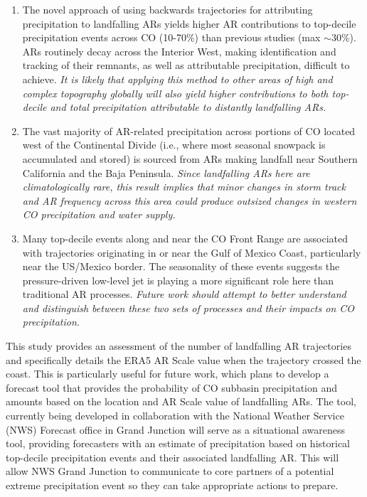 \documentclass[draft]{agujournal2019}
\begin{document}
\begin{enumerate}
  \item The novel approach of using backwards trajectories for attributing precipitation to landfalling ARs yields higher AR contributions to top-decile precipitation events across CO (10-70\%) than previous studies (max $\sim$30\%). ARs routinely decay across the Interior West, making identification and tracking of their remnants, as well as attributable precipitation, difficult to achieve. \textit{It is likely that applying this method to other areas of high and complex topography globally will also yield higher contributions to both top-decile and total precipitation attributable to distantly landfalling ARs.}
  \item The vast majority of AR-related precipitation across portions of CO located west of the Continental Divide (i.e., where most seasonal snowpack is accumulated and stored) is sourced from ARs making landfall near Southern California and the Baja Peninsula. \textit{Since landfalling ARs here are climatologically rare, this result implies that minor changes in storm track and AR frequency across this area could produce outsized changes in western CO precipitation and water supply.}
  \item Many top-decile events along and near the CO Front Range are associated with trajectories originating in or near the Gulf of Mexico Coast, particularly near the US/Mexico border. The seasonality of these events suggests the pressure-driven low-level jet is playing a more significant role here than traditional AR processes. \textit{Future work should attempt to better understand and distinguish between these two sets of processes and their impacts on CO precipitation.}
\end{enumerate}

This study provides an assessment of the number of landfalling AR trajectories and specifically details the ERA5 AR Scale \cite{MartinRalph2019} value when the trajectory crossed the coast. This is particularly useful for future work, which plans to develop a forecast tool that provides the probability of CO subbasin precipitation and amounts based on the location and AR Scale value of landfalling ARs. The tool, currently being developed in collaboration with the National Weather Service (NWS) Forecast office in Grand Junction will serve as a situational awareness tool, providing forecasters with an estimate of precipitation based on historical top-decile precipitation events and their associated landfalling AR. This will allow NWS Grand Junction to communicate to core partners of a potential extreme precipitation event so they can take appropriate actions to prepare.
\end{document}
